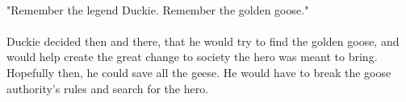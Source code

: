 \documentclass[a4paper,10pt,standalone]{book}
\begin{document}
\paragraph{} "Remember the legend Duckie. Remember the golden goose." 
\paragraph{} Duckie decided then and there, that he would try to find the golden goose, and would help create the great change to society the hero was meant to bring. Hopefully then, he could save all the geese. He would have to break the goose authority's rules and search for the hero.
\vfill
\pagebreak







\end{document}
